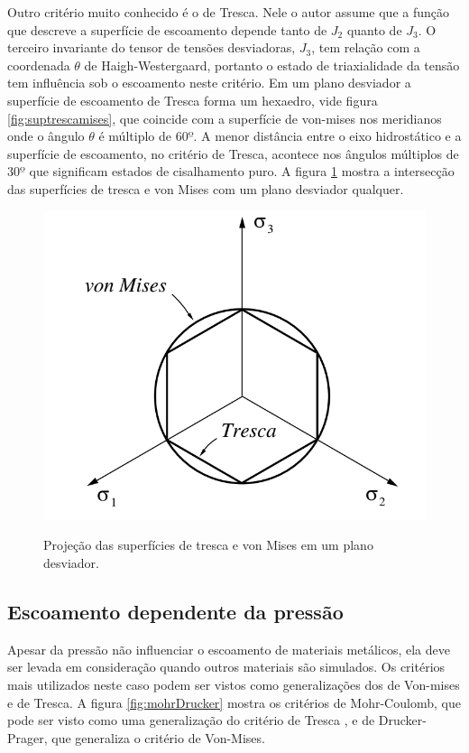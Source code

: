 Outro critério muito conhecido é o de Tresca. Nele o autor assume que a função que descreve a superfície de escoamento depende tanto de $ J_2 $ quanto de $ J_3 $. O terceiro invariante do tensor de tensões desviadoras, $ J_3 $, tem relação com a coordenada $ \theta $ de Haigh-Westergaard, portanto o estado de triaxialidade da tensão tem influência sob o escoamento neste critério. Em um plano desviador a superfície de escoamento de Tresca forma um hexaedro, vide figura \ref{fig:suptrescamises}, que coincide com a superfície de von-mises nos meridianos onde o ângulo $ \theta $ é múltiplo de $ 60º $. A menor distância entre o eixo hidrostático e a superfície de escoamento, no critério de Tresca, acontece nos ângulos múltiplos de $ 30º $ que significam estados de cisalhamento puro. A figura \ref{fig:trescamises} mostra a intersecção das superfícies de tresca e von Mises com um plano desviador qualquer.


\begin{figure}[H]
    \centering
    \caption{Projeção das superfícies de tresca e von Mises em um plano desviador.}
    \includegraphics[width=0.7\linewidth]{images/trescaemises.png} %
    \label{fig:trescamises}
\end{figure}


\subsection{Escoamento dependente da pressão}

Apesar da pressão não influenciar o escoamento de materiais metálicos, ela deve ser levada em consideração quando outros materiais são simulados. Os critérios mais utilizados neste caso podem ser vistos como generalizações dos de Von-mises e de Tresca. A figura \ref{fig:mohrDrucker} mostra os critérios de Mohr-Coulomb, que pode ser visto como uma generalização do critério de Tresca , e de Drucker-Prager, que generaliza o critério de Von-Mises.

